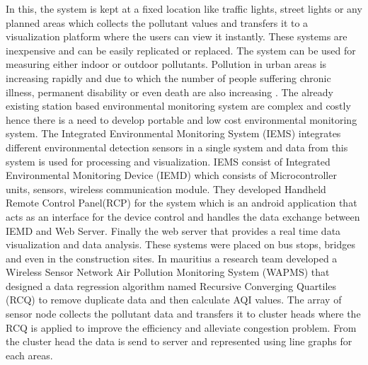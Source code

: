  In this, the system is kept at a fixed location like traffic lights, street lights or any planned areas \cite{Pavani2017} which collects the pollutant values and transfers it to a visualization platform where the users can view it instantly. These systems are inexpensive and can be easily replicated or replaced. The system can be used for measuring either indoor or outdoor pollutants. Pollution in urban areas is increasing rapidly and due to which the number of people suffering chronic illness, permanent disability or even death are also increasing \cite{Wong2014}. The already existing station based environmental monitoring system are complex and costly hence there is a need to develop portable and low cost environmental monitoring system. The Integrated Environmental Monitoring System (IEMS)\cite{Wong2014} integrates different environmental detection sensors in a single  system and data from this system is used for processing and visualization. IEMS consist of Integrated Environmental Monitoring Device (IEMD) which consists of Microcontroller units, sensors, wireless communication module. They developed Handheld Remote Control Panel(RCP) for the system which is an android application that acts as an interface for the device control and handles the data exchange between IEMD and Web Server. Finally the web server that provides a real time data visualization and data analysis. These systems were placed on bus stops, bridges and even in the construction sites. In mauritius a research team developed a Wireless Sensor Network Air Pollution Monitoring System (WAPMS) \cite{K.Khedo2010} that designed a data regression algorithm named Recursive Converging Quartiles (RCQ) to remove duplicate data and then calculate AQI values. The array of sensor node collects the pollutant data and transfers it to cluster heads where the RCQ is applied to improve the efficiency and alleviate congestion problem. From the cluster head the data is send to server and represented using line graphs for each areas.

